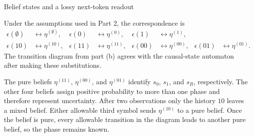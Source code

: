 \begin{exercise}[Core]{Belief states and a lossy next-token readout}
\begin{solution}
\begin{parts}
{\par}

      \item
        \begin{subparts}
          \item Under the assumptions used in Part 2, the correspondence is
            \[
              \begin{aligned}
                \epsilon(\emptyset)&\longleftrightarrow\eta^{(\emptyset)},&
                \epsilon(0)&\longleftrightarrow\eta^{(0)},&
                \epsilon(1)&\longleftrightarrow\eta^{(1)},\\
                \epsilon(10)&\longleftrightarrow\eta^{(10)},&
                \epsilon(11)&\longleftrightarrow\eta^{(11)},&
                \epsilon(00)&\longleftrightarrow\eta^{(00)},&
                \epsilon(01)&\longleftrightarrow\eta^{(01)}.
              \end{aligned}
            \]
            The transition diagram from part (b) agrees with the causal-state
            automaton after making these substitutions.

          \item The pure beliefs $\eta^{(11)}$, $\eta^{(00)}$, and
            $\eta^{(01)}$ identify $s_0$, $s_1$, and $s_R$, respectively. The other four
            beliefs assign positive probability to more than one phase and
            therefore represent uncertainty.
            After two observations only the history $10$ leaves a mixed
            belief. Either allowable third symbol sends $\eta^{(10)}$ to a
            pure belief. Once the belief is pure, every allowable transition
            in the diagram leads to another pure belief, so the phase remains
            known.


\end{subparts}
\end{parts}
\end{solution}
\end{exercise}

